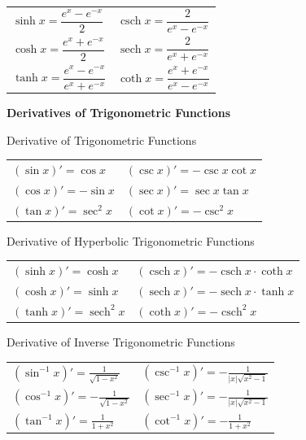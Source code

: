 \documentclass{article}
\DeclareMathOperator{\sech}{sech}
\DeclareMathOperator{\csch}{csch}
\begin{document}
\begin{center}
{\renewcommand{\arraystretch}{2}
\begin{tabular}{ll}
$\sinh x = \dfrac{e^x - e^{-x}}{2}$ & $\csch x = \dfrac{2}{e^x - e^{-x}}$\\
 $\cosh x = \dfrac{e^x + e^{-x}}{2}$ & $\sech x = \dfrac{2}{e^x + e^{-x}}$\\
 $\tanh x = \dfrac{e^x - e^{-x}}{e^x + e^{-x}}$ & $\coth x = \dfrac{e^x + e^{-x}}{e^x - e^{-x}}$
\end{tabular}}

\vspace{0.5cm}

\textbf{Derivatives of Trigonometric Functions}

\vspace{0.3cm}

\begin{minipage}{0.4\linewidth}

\centerline{Derivative of Trigonometric Functions}

\begin{tabular}{ll}
$(\sin x)' = \cos x$ & $(\csc x)' = -\csc x \cot x$\\
$(\cos x)' = -\sin x$ & $(\sec x)' = \sec x \tan x$\\
$(\tan x)' = \sec^2 x$ & $(\cot x)' = -\csc^2 x$
\end{tabular}
\end{minipage}
\hspace{0.3cm}
\begin{minipage}{0.55\linewidth}

\centerline{Derivative of Hyperbolic Trigonometric Functions}

\begin{tabular}{ll}
$(\sinh x)' = \cosh x$ & $(\csch x)' = -\csch x \cdot \coth x$\\
$(\cosh x)' = \sinh x$ & $(\sech x)' = -\sech x \cdot \tanh x$\\
$(\tanh x)' = \sech^{2} x$ & $(\coth x)' = -\csch^2 x$\\
\end{tabular}
\end{minipage}

\vspace{0.5cm}

\begin{minipage}{0.45\linewidth}

\centerline{Derivative of Inverse Trigonometric Functions}

\begin{tabular}{ll}
$(\sin^{-1} x)' = \displaystyle\frac{1}{\sqrt{1-x^2}}$ & $(\csc^{-1} x )' = \displaystyle - \frac{1}{|x|\sqrt{x^2 - 1}}$\\
$(\cos^{-1} x)' = - \displaystyle\frac{1}{\sqrt{1-x^2}}$ & $(\sec^{-1} x )' = \displaystyle - \frac{1}{|x|\sqrt{x^2 - 1}}$\\
$(\tan^{-1} x )' = \displaystyle\frac{1}{1+x^2}$ & $(\cot^{-1} x )' = -\displaystyle\frac{1}{1 + x^2}$
\end{tabular}
\end{minipage}


\end{center}
\end{document}
